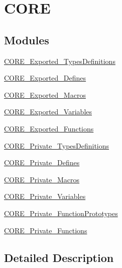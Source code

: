 \hypertarget{group___c_o_r_e}{}\section{C\+O\+RE}
\label{group___c_o_r_e}
\subsection*{Modules}
\begin{DoxyCompactItemize}
\item 
\mbox{\hyperlink{group___c_o_r_e___exported___types_definitions}{C\+O\+R\+E\+\_\+\+Exported\+\_\+\+Types\+Definitions}}
\item 
\mbox{\hyperlink{group___c_o_r_e___exported___defines}{C\+O\+R\+E\+\_\+\+Exported\+\_\+\+Defines}}
\item 
\mbox{\hyperlink{group___c_o_r_e___exported___macros}{C\+O\+R\+E\+\_\+\+Exported\+\_\+\+Macros}}
\item 
\mbox{\hyperlink{group___c_o_r_e___exported___variables}{C\+O\+R\+E\+\_\+\+Exported\+\_\+\+Variables}}
\item 
\mbox{\hyperlink{group___c_o_r_e___exported___functions}{C\+O\+R\+E\+\_\+\+Exported\+\_\+\+Functions}}
\item 
\mbox{\hyperlink{group___c_o_r_e___private___types_definitions}{C\+O\+R\+E\+\_\+\+Private\+\_\+\+Types\+Definitions}}
\item 
\mbox{\hyperlink{group___c_o_r_e___private___defines}{C\+O\+R\+E\+\_\+\+Private\+\_\+\+Defines}}
\item 
\mbox{\hyperlink{group___c_o_r_e___private___macros}{C\+O\+R\+E\+\_\+\+Private\+\_\+\+Macros}}
\item 
\mbox{\hyperlink{group___c_o_r_e___private___variables}{C\+O\+R\+E\+\_\+\+Private\+\_\+\+Variables}}
\item 
\mbox{\hyperlink{group___c_o_r_e___private___function_prototypes}{C\+O\+R\+E\+\_\+\+Private\+\_\+\+Function\+Prototypes}}
\item 
\mbox{\hyperlink{group___c_o_r_e___private___functions}{C\+O\+R\+E\+\_\+\+Private\+\_\+\+Functions}}
\end{DoxyCompactItemize}


\subsection{Detailed Description}
